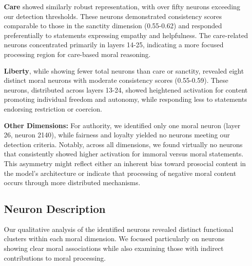 \documentclass[runninghheads]{llncs}
\begin{document}
\textbf{Care} showed similarly robust representation, with over fifty neurons exceeding our detection thresholds. These neurons demonstrated consistency scores comparable to those in the sanctity dimension (0.55-0.62) and responded preferentially to statements expressing empathy and helpfulness. The care-related neurons concentrated primarily in layers 14-25, indicating a more focused processing region for care-based moral reasoning.

\textbf{Liberty}, while showing fewer total neurons than care or sanctity, revealed eight distinct moral neurons with moderate consistency scores (0.55-0.59). These neurons, distributed across layers 13-24, showed heightened activation for content promoting individual freedom and autonomy, while responding less to statements endorsing restriction or coercion.

\textbf{Other Dimensions:} For authority, we identified only one moral neuron (layer 26, neuron 2140), while fairness and loyalty yielded no neurons meeting our detection criteria. Notably, across all dimensions, we found virtually no neurons that consistently showed higher activation for immoral versus moral statements. This asymmetry might reflect either an inherent bias toward prosocial content in the model's architecture or indicate that processing of negative moral content occurs through more distributed mechanisms.



\subsection{Neuron Description}

Our qualitative analysis of the identified neurons revealed distinct functional clusters within each moral dimension. We focused particularly on neurons showing clear moral associations while also examining those with indirect contributions to moral processing.
\end{document}
